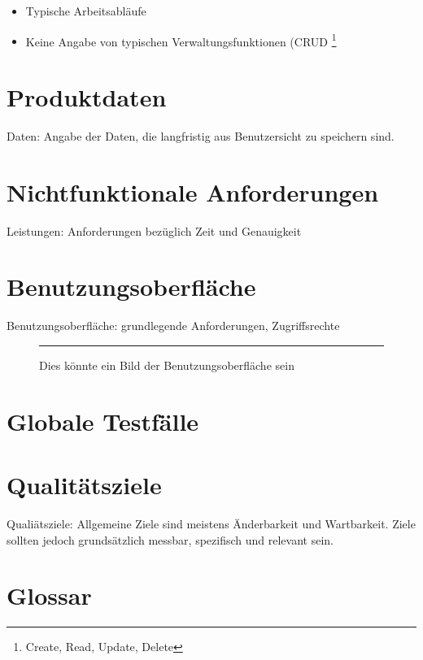 \documentclass[a4paper]{scrreprt}
\begin{document}
        \begin{itemize}
            \item Typische Arbeitsabläufe
            \item Keine Angabe von typischen Verwaltungsfunktionen (CRUD \footnote{Create,
                  Read, Update, Delete}
        \end{itemize}
 
    \chapter{Produktdaten}
        Daten: Angabe der Daten, die langfristig aus Benutzersicht zu speichern sind.
 
    \chapter{Nichtfunktionale Anforderungen}
        Leistungen: Anforderungen bezüglich Zeit und Genauigkeit
 
    \chapter{Benutzungsoberfläche}
        Benutzungsoberfläche: grundlegende Anforderungen, Zugriffsrechte
 
        \begin{figure}[ht]
            \centering
            \rule{8cm}{6cm}
            \caption{Dies könnte ein Bild der Benutzungsoberfläche sein}
        \end{figure}

    \chapter{Globale Testfälle}
 
    \chapter{Qualitätsziele}
        Qualiätsziele: Allgemeine Ziele sind meistens Änderbarkeit und Wartbarkeit.
        Ziele sollten jedoch grundsätzlich messbar, spezifisch und relevant sein.
 
    \chapter{Glossar}
 
    \listoffigures
 
\end{document}
